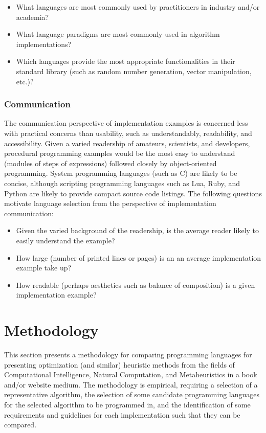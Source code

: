 \documentclass[a4paper, 11pt]{article}
\begin{document}
\begin{itemize}
	\item What languages are most commonly used by practitioners in industry and/or academia?
	\item What language paradigms are most commonly used in algorithm implementations?
	\item Which languages provide the most appropriate functionalities in their standard library (such as random number generation, vector manipulation, etc.)?
\end{itemize}

\subsubsection{Communication}
The communication perspective of implementation examples is concerned less with practical concerns than usability, such as understandably, readability, and accessibility. 
Given a varied readership of amateurs, scientists, and developers, procedural programming examples would be the most easy to understand (modules of steps of expressions) followed closely by object-oriented programming. System programming languages (such as C) are likely to be concise, although scripting programming languages such as Lua, Ruby, and Python are likely to provide compact source code listings.
The following questions motivate language selection from the perspective of implementation communication:

\begin{itemize}
	\item Given the varied background of the readership, is the average reader likely to easily understand the example?
	\item How large (number of printed lines or pages) is an an average implementation example take up?
	\item How readable (perhaps aesthetics such as balance of composition) is a given implementation example?	
\end{itemize}

% 
%
\section{Methodology}
\label{sec:methodology}
This section presents a methodology for comparing programming languages for presenting optimization (and similar) heuristic methods from the fields of Computational Intelligence, Natural Computation, and Metaheuristics in a book and/or website medium. The methodology is empirical, requiring a selection of a representative algorithm, the selection of some candidate programming languages for the selected algorithm to be programmed in, and the identification of some requirements and guidelines for each implementation such that they can be compared.
\end{document}
